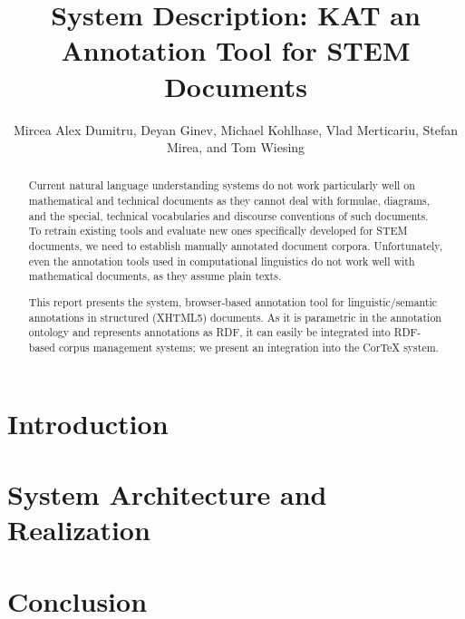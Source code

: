 \documentclass{llncs}
\title{System Description: KAT an Annotation Tool for STEM Documents}
\author{Mircea Alex Dumitru, Deyan Ginev, Michael  Kohlhase, Vlad Merticariu, Stefan
  Mirea, and Tom Wiesing}
\institute{
  Computer Science\\ Jacobs University Bremen\\
  \url{http://kwarc.info}
}
\begin{document}
\maketitle
\begin{abstract}
  Current natural language understanding systems do not work particularly well on
  mathematical and technical documents as they cannot deal with formulae, diagrams, and
  the special, technical vocabularies and discourse conventions of such documents. To
  retrain existing tools and evaluate new ones specifically developed for STEM documents,
  we need to establish manually annotated document corpora. Unfortunately, even the
  annotation tools used in computational linguistics do not work well with mathematical
  documents, as they assume plain texts.

  This report presents the \KAT system, browser-based annotation tool for
  linguistic/semantic annotations in structured (XHTML5) documents. As it is parametric in
  the annotation ontology and represents annotations as RDF, it can easily be integrated
  into RDF-based corpus management systems; we present an integration into the CorTeX
  system.
\end{abstract}

\section{Introduction}\label{sec:intro}


\section{System Architecture and Realization}\label{sec:arch}

\section{Conclusion}\label{sec:concl}



\printbibliography
\end{document}

